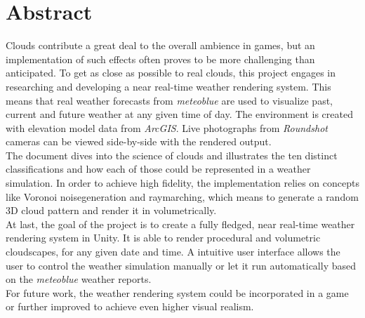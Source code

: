 \section*{Abstract}
Clouds contribute a great deal to the overall ambience in games, but an implementation of such effects often proves to be more challenging than anticipated.
To get as close as possible to real clouds, this project engages in researching and developing a near real-time weather rendering system.
This means that real weather forecasts from \emph{meteoblue} are used to visualize past, current and future weather at any given time of day.
The environment is created with elevation model data from \emph{ArcGIS}. Live photographs from \emph{Roundshot} cameras can be viewed side-by-side with the rendered output.
\\
The document dives into the science of clouds and illustrates the ten distinct classifications and how each of those could be represented in a weather simulation. 
In order to achieve high fidelity, the implementation relies on concepts like Voronoi \gls{noisegeneration} and \gls{raymarching}, which means to generate a random 3D cloud pattern and render it in volumetrically.
\\
At last, the goal of the project is to create a fully fledged, near real-time weather rendering system in Unity.
It is able to render \gls{procedural} and volumetric cloudscapes, for any given date and time.
A intuitive user interface allows the user to control the weather simulation manually or let it run automatically based on the \emph{meteoblue} weather reports.
\\
For future work, the weather rendering system could be incorporated in a game or further improved to achieve even higher visual realism.